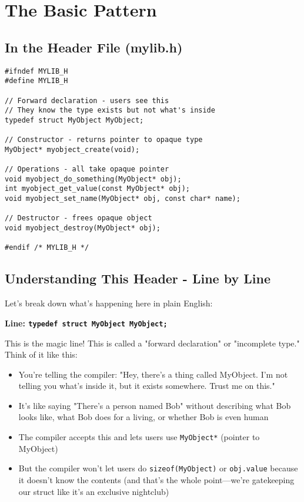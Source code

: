 \section{The Basic Pattern}

\subsection{In the Header File (mylib.h)}

\begin{lstlisting}
#ifndef MYLIB_H
#define MYLIB_H

// Forward declaration - users see this
// They know the type exists but not what's inside
typedef struct MyObject MyObject;

// Constructor - returns pointer to opaque type
MyObject* myobject_create(void);

// Operations - all take opaque pointer
void myobject_do_something(MyObject* obj);
int myobject_get_value(const MyObject* obj);
void myobject_set_name(MyObject* obj, const char* name);

// Destructor - frees opaque object
void myobject_destroy(MyObject* obj);

#endif /* MYLIB_H */
\end{lstlisting}

\subsection*{Understanding This Header - Line by Line}

Let's break down what's happening here in plain English:

\textbf{Line: \texttt{typedef struct MyObject MyObject;}}

This is the magic line! This is called a "forward declaration" or "incomplete type." Think of it like this:

\begin{itemize}
    \item You're telling the compiler: "Hey, there's a thing called MyObject. I'm not telling you what's inside it, but it exists somewhere. Trust me on this."
    \item It's like saying "There's a person named Bob" without describing what Bob looks like, what Bob does for a living, or whether Bob is even human
    \item The compiler accepts this and lets users use \texttt{MyObject*} (pointer to MyObject)
    \item But the compiler won't let users do \texttt{sizeof(MyObject)} or \texttt{obj.value} because it doesn't know the contents (and that's the whole point---we're gatekeeping our struct like it's an exclusive nightclub)
\end{itemize}

